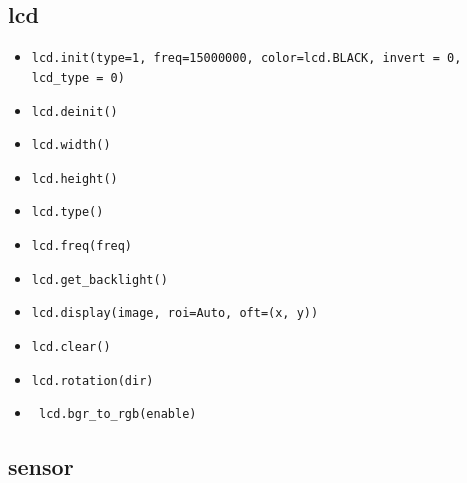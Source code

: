 \documentclass[UTF8]{ctexart}
\begin{document}
    \subsection{lcd}
    \begin{itemize}
        \item \colorbox{mygrey}{\color{myred}\lstinline|lcd.init(type=1, freq=15000000, color=lcd.BLACK, invert = 0, lcd_type = 0)|}
        \item \colorbox{mygrey}{\color{myred}\lstinline|lcd.deinit()|}
        \item \colorbox{mygrey}{\color{myred}\lstinline|lcd.width()|}
        \item \colorbox{mygrey}{\color{myred}\lstinline|lcd.height()|}
        \item \colorbox{mygrey}{\color{myred}\lstinline|lcd.type()|}
        \item \colorbox{mygrey}{\color{myred}\lstinline|lcd.freq(freq)|}
        \item \colorbox{mygrey}{\color{myred}\lstinline|lcd.get_backlight()|}
        \item \colorbox{mygrey}{\color{myred}\lstinline|lcd.display(image, roi=Auto, oft=(x, y))|}
        \item \colorbox{mygrey}{\color{myred}\lstinline|lcd.clear()|}
        \item \colorbox{mygrey}{\color{myred}\lstinline|lcd.rotation(dir)|}
        \item \colorbox{mygrey}{\color{myred}\lstinline| lcd.bgr_to_rgb(enable)|}
    \end{itemize}

    \subsection{sensor}
    
\end{document}
